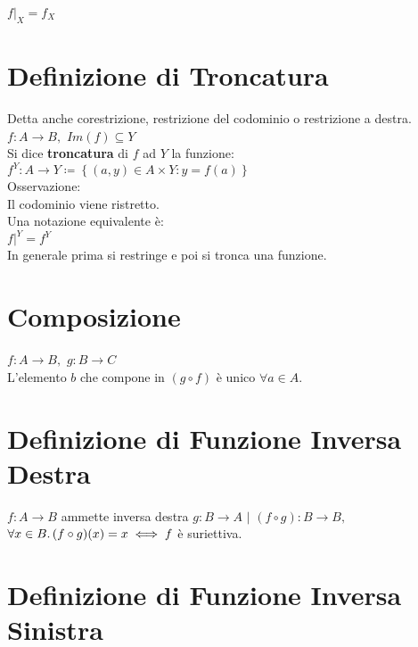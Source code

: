 \documentclass[a4paper, twoside, italian, 11pt]{book}
\newcommand{\braces}[1] {\left \{ #1 \right \}}
\begin{document}
$f|_X = f_X$



\section{Definizione di Troncatura}

Detta anche corestrizione, restrizione del codominio o restrizione a destra. \\

\noindent
$f : A \rightarrow B,$ $Im(f) \subseteq Y$ \\

\noindent
Si dice \textbf{troncatura} di $f$ ad $Y$ la funzione: \\

$f^Y : A \rightarrow Y \coloneqq \braces{(a, y) \in A \times Y : y = f(a)}$ \\

\noindent
Osservazione: \\
Il codominio viene ristretto. \\

\noindent
Una notazione equivalente è: \\

$f|^Y = f^Y$ \\

\noindent
In generale prima si restringe e poi si tronca una funzione.



\section{Composizione}

$f : A \rightarrow B,$ $g : B \rightarrow C$ \\
\noindent
L'elemento $b$ che compone in $(g \circ f)$ è unico $\forall a \in A$.



\section{Definizione di Funzione Inversa Destra}

$f : A \rightarrow B$ ammette inversa destra $g : B \rightarrow A$ $|$ $(f \circ g) : B \rightarrow B,$ $\forall x \in B \ldotp (f \circ g)(x) = x \iff f$ è suriettiva.



\section{Definizione di Funzione Inversa Sinistra}
\end{document}
